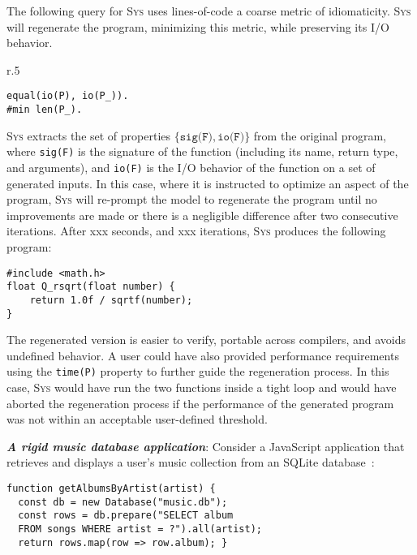 \documentclass[sigplan]{acmart}
\newcommand{\sys}{{\scshape Sys}\xspace}
\newcommand{\heading}[1]{\vspace{2pt}\noindent\textbf{\emph{#1}}:\enspace}
\newcommand{\ttt}[1]{\texttt{#1}}
\newcommand{\xxx}{\colorbox{red!30}{xxx}\xspace}
\begin{document}
The following query for \sys uses lines-of-code a coarse metric of
idiomaticity. \sys will regenerate the program, minimizing this metric, while
preserving its I/O behavior.
\begin{wrapfigure}[3]{r}{.5\columnwidth}
  \vspace{-5pt}
  \begin{verbatim}
equal(io(P), io(P_)).
#min len(P_).
  \end{verbatim}
\end{wrapfigure}
\sys extracts the set of properties $\{\texttt{sig(F)}, \texttt{io(F)}\}$ from the original program, where \texttt{sig(F)} is the
signature of the function (including its name, return type, and arguments), and \texttt{io(F)} is the I/O behavior of the function
on a set of generated inputs.
In this case, where it is instructed to optimize an aspect of the program, \sys will re-prompt
the model to regenerate the program until no improvements are made or there is a negligible difference after two consecutive iterations.
After \xxx seconds, and \xxx iterations, \sys produces the following program:
\begin{verbatim}
#include <math.h>
float Q_rsqrt(float number) {
    return 1.0f / sqrtf(number);
}
\end{verbatim}
The regenerated version is easier to verify, portable across compilers, and
avoids undefined behavior.
A user could have also provided performance requirements using 
the \ttt{time(P)} property to further guide the regeneration process.
In this case, \sys would have run the two functions inside a tight loop and 
would have aborted the regeneration process if the performance of the generated
program was not within an acceptable user-defined threshold.

\heading{A rigid music database application}
Consider a JavaScript application that retrieves and displays a user's music
collection from an SQLite database~\cite{codewithsadeemusicplayer, beets}:

\begin{verbatim}
function getAlbumsByArtist(artist) {
  const db = new Database("music.db");
  const rows = db.prepare("SELECT album
  FROM songs WHERE artist = ?").all(artist);
  return rows.map(row => row.album); }
\end{verbatim}
\end{document}
